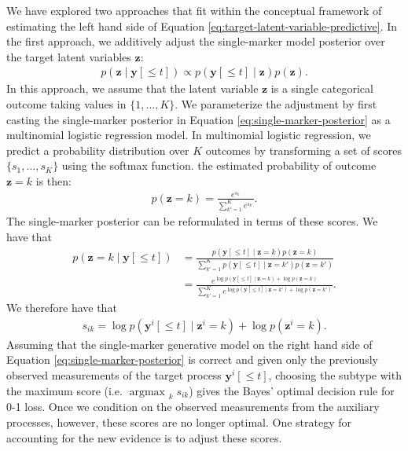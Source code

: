 \documentclass[12pt]{article}
\newcommand{\given}{\mid}
\DeclareMathOperator*{\argmax}{argmax\,\,}
\begin{document}
We have explored two approaches that fit within the conceptual framework of estimating the left hand side of Equation \ref{eq:target-latent-variable-predictive}. In the first approach, we additively adjust the single-marker model posterior over the target latent variables $\bm{z}$:
\begin{align}
\label{eq:single-marker-posterior}
p(\bm{z} \given \bm{y}[\le t]) \propto p(\bm{y}[\le t] \given \bm{z}) p(\bm{z}).
\end{align}
In this approach, we assume that the latent variable $\bm{z}$ is a single categorical outcome taking values in $\{1, \ldots, K\}$. We parameterize the adjustment by first casting the single-marker posterior in Equation \ref{eq:single-marker-posterior} as a multinomial logistic regression model. In multinomial logistic regression, we predict a probability distribution over $K$ outcomes by transforming a set of scores $\{s_1, \ldots, s_K\}$ using the softmax function. the estimated probability of outcome $\bm{z} = k$ is then:
\begin{align}
p(\bm{z} = k) = \frac{e^{s_k}}{\sum_{k' = 1}^K e^{s_{k'}}}.
\end{align}
The single-marker posterior can be reformulated in terms of these scores. We have that
\begin{align}
p(\bm{z} = k \given \bm{y}[\le t])
	&= \frac{p( \bm{y}[\le t] \given \bm{z} = k ) p( \bm{z} = k ) }{ \sum_{k' = 1}^K p( \bm{y}[\le t] \given \bm{z} = k' ) p( \bm{z} = k' ) } \\
	&= \frac{ e^{\log p( \bm{y}[\le t] \given \bm{z} = k ) + \log p( \bm{z} = k )} }{ \sum_{k' = 1}^K e^{ \log p( \bm{y}[\le t] \given \bm{z} = k' ) + \log p( \bm{z} = k' )} }.
\end{align}
We therefore have that
\begin{align}
	s_{ik} = \log p(\bm{y}^i[\le t] \given \bm{z}^i = k) + \log p(\bm{z}^i = k).
\end{align}
Assuming that the single-marker generative model on the right hand side of Equation \ref{eq:single-marker-posterior} is correct and given only the previously observed measurements of the target process $\bm{y}^i[\le t]$, choosing the subtype with the maximum score (i.e. $\argmax_k s_{ik}$) gives the Bayes' optimal decision rule for 0-1 loss. Once we condition on the observed measurements from the auxiliary processes, however, these scores are no longer optimal. One strategy for accounting for the new evidence is to adjust these scores.
\end{document}
